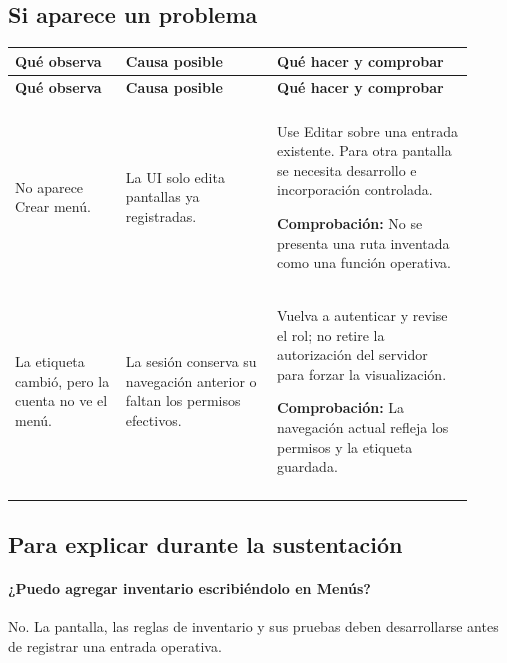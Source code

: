 \subsection{Si aparece un problema}
\begingroup
\fontsize{10}{12.5}\selectfont
\setlength{\tabcolsep}{5pt}
\renewcommand{\arraystretch}{1.15}
\begin{longtable}{@{}>{\RaggedRight\arraybackslash}p{0.22\linewidth}>{\RaggedRight\arraybackslash}p{0.3\linewidth}>{\RaggedRight\arraybackslash}p{0.39\linewidth}@{}}
\toprule
\textbf{Qué observa} & \textbf{Causa posible} & \textbf{Qué hacer y comprobar} \\
\midrule
\endfirsthead
\toprule
\textbf{Qué observa} & \textbf{Causa posible} & \textbf{Qué hacer y comprobar} \\
\midrule
\endhead
\midrule
\multicolumn{3}{r}{\footnotesize Continúa en la página siguiente}\\
\endfoot
\bottomrule
\endlastfoot
No aparece Crear menú. & La UI solo edita pantallas ya registradas. & Use Editar sobre una entrada existente. Para otra pantalla se necesita desarrollo e incorporación controlada.\par\smallskip\textbf{Comprobación:} No se presenta una ruta inventada como una función operativa. \\
\addlinespace[3pt]
La etiqueta cambió, pero la cuenta no ve el menú. & La sesión conserva su navegación anterior o faltan los permisos efectivos. & Vuelva a autenticar y revise el rol; no retire la autorización del servidor para forzar la visualización.\par\smallskip\textbf{Comprobación:} La navegación actual refleja los permisos y la etiqueta guardada. \\
\addlinespace[3pt]
\end{longtable}
\endgroup

\subsection{Para explicar durante la sustentación}
\paragraph{¿Puedo agregar inventario escribiéndolo en Menús?} No. La pantalla, las reglas de inventario y sus pruebas deben desarrollarse antes de registrar una entrada operativa.


